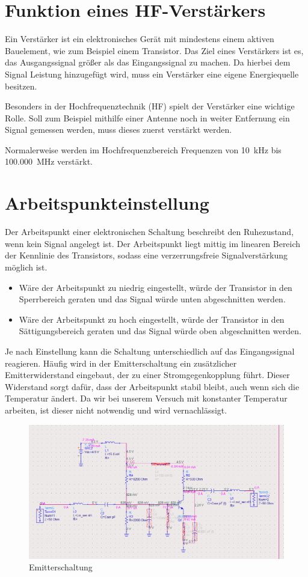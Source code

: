 \section{Funktion eines HF-Verstärkers}
Ein Verstärker ist ein elektronisches Gerät mit mindestens einem 
aktiven Bauelement, wie zum Beispiel einem Transistor.
Das Ziel eines Verstärkers ist es, das Ausgangssignal 
größer als das Eingangssignal zu machen. Da hierbei dem Signal Leistung hinzugefügt
wird, muss ein Verstärker eine eigene Energiequelle besitzen.

Besonders in der Hochfrequenztechnik (HF) spielt der Verstärker eine wichtige
Rolle. Soll zum Beispiel mithilfe einer Antenne noch in weiter Entfernung ein Signal
gemessen werden, muss dieses zuerst verstärkt werden.

Normalerweise werden im Hochfrequenzbereich Frequenzen von 10~kHz bis 100.000~MHz
verstärkt.
\clearpage

\section{Arbeitspunkteinstellung}
Der Arbeitspunkt einer elektronischen Schaltung beschreibt den 
Ruhezustand, wenn kein Signal angelegt ist.
Der Arbeitspunkt liegt mittig im linearen Bereich der Kennlinie des Transistors,
sodass eine verzerrungsfreie Signalverstärkung möglich ist.
\begin{itemize}
    \item Wäre der Arbeitspunkt zu niedrig eingestellt, würde der Transistor in den Sperrbereich geraten und das Signal würde unten abgeschnitten werden.
    \item Wäre der Arbeitspunkt zu hoch eingestellt, würde der Transistor in den Sättigungsbereich geraten und das Signal würde oben abgeschnitten werden.
\end{itemize}
Je nach Einstellung kann die Schaltung unterschiedlich auf das Eingangssignal
reagieren.
Häufig wird in der Emitterschaltung ein zusätzlicher Emitterwiderstand eingebaut, der zu einer Stromgegenkopplung führt.
Dieser Widerstand sorgt dafür, dass der Arbeitspunkt stabil bleibt, auch wenn sich die Temperatur ändert.
Da wir bei unserem Versuch mit konstanter Temperatur arbeiten, ist dieser nicht notwendig und wird vernachlässigt.

\begin{figure}[h]
    \centering
    \includegraphics[width=1.0\textwidth]{Pictures/Schaltplan.png}
    \caption{Emitterschaltung}
\end{figure}

